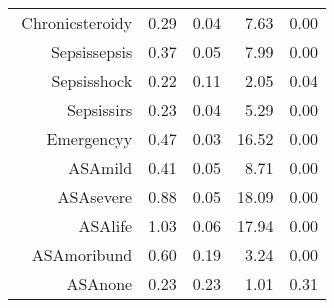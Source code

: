 \begin{tabular}{rrrrr}
$$  Chronic\-steroid\-y & 0.29 & 0.04 & 7.63 & 0.00 \\ 
  Sepsis\-sepsis & 0.37 & 0.05 & 7.99 & 0.00 \\ 
  Sepsis\-shock & 0.22 & 0.11 & 2.05 & 0.04 \\ 
  Sepsis\-sirs & 0.23 & 0.04 & 5.29 & 0.00 \\ 
  Emergency\-y & 0.47 & 0.03 & 16.52 & 0.00 \\ 
  ASA\-mild & 0.41 & 0.05 & 8.71 & 0.00 \\ 
  ASA\-severe & 0.88 & 0.05 & 18.09 & 0.00 \\ 
  ASA\-life & 1.03 & 0.06 & 17.94 & 0.00 \\ 
  ASA\-moribund & 0.60 & 0.19 & 3.24 & 0.00 \\ 
  ASA\-none & 0.23 & 0.23 & 1.01 & 0.31 \\ 
   \hline
\end{tabular}

